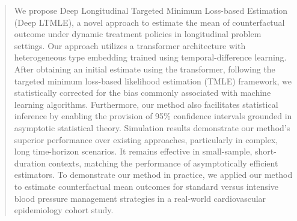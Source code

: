 \documentclass{article}
\theoremstyle{plain}
\theoremstyle{definition}
\theoremstyle{remark}
\begin{document}
\printAffiliationsAndNotice{}  %

\begin{abstract}
We propose Deep Longitudinal Targeted Minimum Loss-based Estimation (Deep LTMLE), a novel approach to estimate the mean of counterfactual outcome under dynamic treatment policies in longitudinal problem settings. Our approach utilizes a transformer architecture with heterogeneous type embedding trained using temporal-difference learning. After obtaining an initial estimate using the transformer, following the targeted minimum loss-based likelihood estimation (TMLE) framework, we statistically corrected for the bias commonly associated with machine learning algorithms. Furthermore, our method also facilitates statistical inference by enabling the provision of 95\% confidence intervals grounded in asymptotic statistical theory. Simulation results demonstrate our method's superior performance over existing approaches, particularly in complex, long time-horizon scenarios. It remains effective in small-sample, short-duration contexts, matching the performance of asymptotically efficient estimators. To demonstrate our method in practice, we applied our method to estimate counterfactual mean outcomes for standard versus intensive blood pressure management strategies in a real-world cardiovascular epidemiology cohort study.
\end{abstract}

\end{document}

